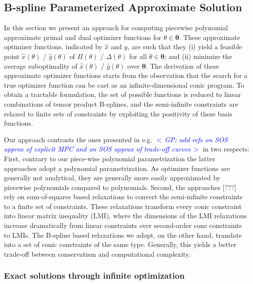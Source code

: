 \documentclass{article}
\newcommand{\commentGP}[1]{\noindent \textcolor{blue}{\emph{$<\,$GP: #1$\,>$}}}%
\newcommand{\ppar}{\theta}                          %
\newcommand{\Ppar}{{\bm{\theta}}}                   %
\begin{document}

\subsection{B-spline Parameterized Approximate Solution}\label{subsec:parameterized_solution}%

In this section we present an approach for computing piecewise polynomial approximate primal and dual optimizer functions for $\ppar\in\Ppar$. These approximate optimizer functions, indicated by $\hat{x}$ and $\hat{y}$, are such that they (i) yield a feasible point $\hat{x}(\ppar)$ / $\hat{y}(\ppar)$ of $\Pi(\ppar)$ / $\Delta(\ppar)$ for all $\ppar\in\Ppar$; and (ii) minimize the average suboptimality of $\hat{x}(\ppar)$ / $\hat{y}(\ppar)$ over $\Ppar$. The derivation of these approximate optimizer functions starts from the observation that the search for a true optimizer function can be cast as an infinite-dimensional conic program. To obtain a tractable formulation, the set of possible functions is reduced to linear combinations of tensor product B-splines, and the semi-infinite constraints are relaxed to finite sets of constraints by exploiting the positivity of these basis functions.

Our approach contrasts the ones presented in e.g. \commentGP{add refs on SOS approx of explicit MPC and on SOS approx of trade-off curves} in two respects: First, contrary to our piece-wise polynomial parametrization the latter approaches adopt a polynomial parametrization. As optimizer functions are generally not analytical, they are generally more easily approximated by piecewise polynomials compared to polynomials. Second, the approaches [???] rely on sum-of-squares based relaxations to convert the semi-infinite constraints to a finite set of constraints. These relaxations transform every conic constraint into linear matrix inequality (LMI), where the dimensions of the LMI relaxations increase dramatically from linear constraints over second-order cone constraints to LMIs. The B-spline based relaxations we adopt, on the other hand, translate into a set of conic constraints of the same type. Generally, this yields a better trade-off between conservatism and computational complexity.


\subsubsection{Exact solutions through infinite optimization}%
\end{document}
